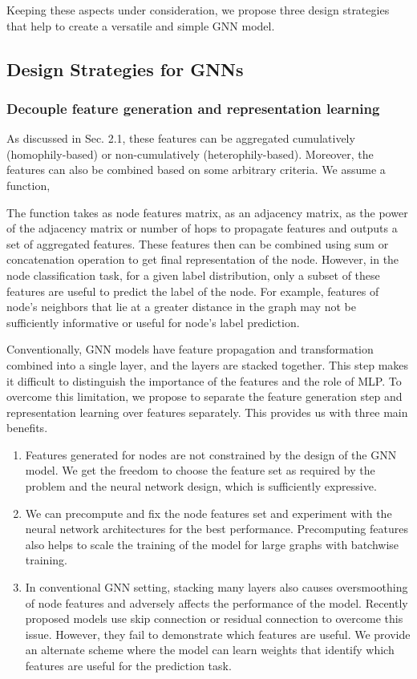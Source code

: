 \documentclass[sigconf,natbib=false]{acmart}
\begin{document}
Keeping these aspects under consideration, we propose three design strategies that help to create a versatile and simple GNN model.

\vspace{5mm}
\subsection{Design Strategies for GNNs}
\subsubsection{Decouple feature generation and representation learning}\hfill

As discussed in Sec. 2.1, these features can be aggregated cumulatively (homophily-based) or non-cumulatively (heterophily-based). Moreover, the features can also be combined based on some arbitrary criteria. We assume a function, 

The function takes  as node features matrix,  as an adjacency matrix,  as the power of the adjacency matrix or number of hops to propagate features and outputs a set of aggregated features. These features then can be combined using sum or concatenation operation to get final representation of the node.  However, in the node classification task, for a given label distribution, only a subset of these features are useful to predict the label of the node. For example, features of node's neighbors that lie at a greater distance in the graph may not be sufficiently informative or useful for node's label prediction.

Conventionally, GNN models have feature propagation and transformation combined into a single layer, and the layers are stacked together. This step makes it difficult to distinguish the importance of the features and the role of MLP. To overcome this limitation, we propose to separate the feature generation step and representation learning over features separately. This provides us with three main benefits. 

\renewcommand{\labelenumi}{(\roman{enumi})}
\begin{enumerate}
    \item Features generated for nodes are not constrained by the design of the GNN model. We get the freedom to choose the feature set as required by the problem and the neural network design, which is sufficiently expressive.
    \item We can precompute and fix the node features set and experiment with the neural network architectures for the best performance. Precomputing features also helps to scale the training of the model for large graphs with batchwise training.
    \item In conventional GNN setting, stacking many layers also causes oversmoothing of node features \cite{chen_measuring_2019} and adversely affects the performance of the model. Recently proposed models use skip connection or residual connection to overcome this issue. However, they fail to demonstrate which features are useful. We provide an alternate scheme where the model can learn weights that identify which features are useful for the prediction task.
\end{enumerate}
\end{document}
